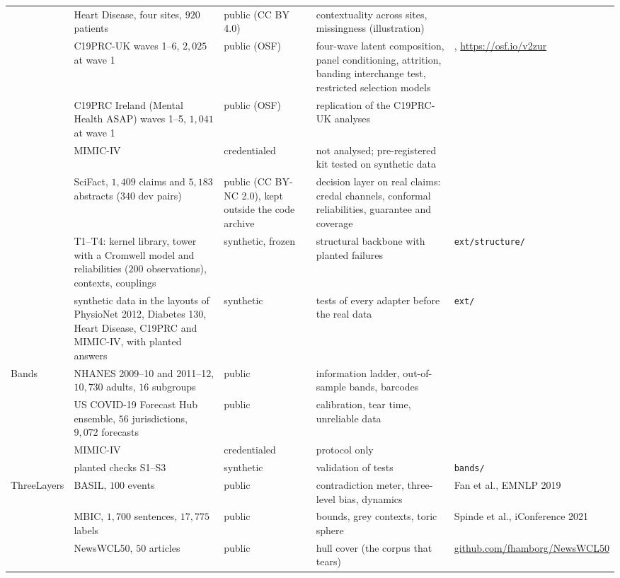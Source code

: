 \documentclass[11pt]{article}
\theoremstyle{definition}
\theoremstyle{remark}
\begin{document}
{\begin{longtable}{>{\raggedright}p{1.7cm}>{\raggedright}p{3.7cm}>{\raggedright}p{1.5cm}>{\raggedright}p{3.9cm}>{\raggedright\arraybackslash}p{4.2cm}}
 & Heart Disease, four sites, $920$ patients & public (CC BY 4.0) & contextuality across sites, missingness (illustration) & \cite{Detrano1989,UCIHeart}\\
 & C19PRC-UK waves 1--6, $2{,}025$ at wave 1 & public (OSF) & four-wave latent composition, panel conditioning, attrition, banding interchange test, restricted selection models & \cite{McBride2021}, \url{https://osf.io/v2zur}\\
 & C19PRC Ireland (Mental Health ASAP) waves 1--5, $1{,}041$ at wave 1 & public (OSF) & replication of the C19PRC-UK analyses & \cite{SpikolIE}\\
 & MIMIC-IV & credentialed & not analysed; pre-registered kit tested on synthetic data & \cite{MIMICIV}\\
 & SciFact, $1{,}409$ claims and $5{,}183$ abstracts ($340$ dev pairs) & public (CC BY-NC 2.0), kept outside the code archive & decision layer on real claims: credal channels, conformal reliabilities, guarantee and coverage & \cite{Wadden2020}\\
 & T1--T4: kernel library, tower with a Cromwell model and reliabilities ($200$ observations), contexts, couplings & synthetic, frozen & structural backbone with planted failures & \texttt{ext/structure/}\\
 & synthetic data in the layouts of PhysioNet 2012, Diabetes 130, Heart Disease, C19PRC and MIMIC-IV, with planted answers & synthetic & tests of every adapter before the real data & \texttt{ext/}\\
Bands & NHANES 2009--10 and 2011--12, $10{,}730$ adults, $16$ subgroups & public & information ladder, out-of-sample bands, barcodes & \cite{NHANESpkg}\\
 & US COVID-19 Forecast Hub ensemble, $56$ jurisdictions, $9{,}072$ forecasts & public & calibration, tear time, unreliable data & \cite{Cramer2022}\\
 & MIMIC-IV & credentialed & protocol only & \cite{MIMICIV}\\
 & planted checks S1--S3 & synthetic & validation of tests & \texttt{bands/}\\
ThreeLayers & BASIL, $100$ events & public & contradiction meter, three-level bias, dynamics & Fan et al., EMNLP 2019\\
 & MBIC, $1{,}700$ sentences, $17{,}775$ labels & public & bounds, grey contexts, toric sphere & Spinde et al., iConference 2021\\
 & NewsWCL50, $50$ articles & public & hull cover (the corpus that tears) & \url{github.com/fhamborg/NewsWCL50}\\

\end{longtable}}
\end{document}
